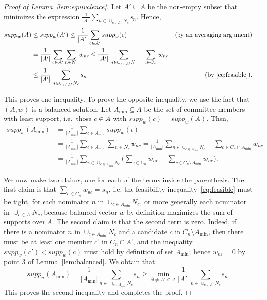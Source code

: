 \begin{proof}[Proof of Lemma~\ref{lem:equivalence}]
Let $A'\subseteq A$ be the non-empty subset that minimizes the expression $\frac{1}{|A'|} \sum_{n\in \cup_{c\in A'} N_c} s_n$. Hence, 
\begin{align*}
    supp_w(A) &\leq supp_w(A') \leq \frac{1}{|A'|} \sum_{c\in A'} supp_w(c) &\text{(by an averaging argument)}\\
    & = \frac{1}{|A'|} \sum_{c\in A'} \sum_{n\in N_c} w_{nc} 
     \leq \frac{1}{|A'|}  \sum_{n\in \cup_{c\in A'} N_c} \quad \sum_{c\in C_n} w_{nc} \\
    & \leq \frac{1}{|A'|} \sum_{n\in \cup_{c\in A'} N_c} s_n &\text{(by \ref{eq:feasible})}.
\end{align*}

This proves one inequality. To prove the opposite inequality, we use the fact that $(A,w)$ is a balanced solution. 
Let $A_{\min}\subseteq A$ be the set of committee members with least support, i.e.~those $c\in A$ with $supp_w(c)=supp_w(A)$. Then,
\begin{align*}
    supp_w(A_{\min}) &= \frac{1}{|A_{\min}|} \sum_{c\in A_{\min}} supp_w(c) \\
    &= \frac{1}{|A_{\min}|} \sum_{c\in A_{\min}} \sum_{n\in N_c} w_{nc} 
    = \frac{1}{|A_{\min}|} \sum_{n\in \cup_{c\in A_{\min}} N_c} \quad \sum_{c\in C_n\cap A_{\min}} w_{nc} \\
    &= \frac{1}{|A_{\min}|} \sum_{n\in \cup_{c\in A_{\min}} N_c} \Big( \sum_{c\in C_n} w_{nc} - \sum_{c\in C_n \setminus A_{\min}} w_{nc}\Big).
\end{align*}

We now make two claims, one for each of the terms inside the parenthesis. 
The first claim is that $\sum_{c\in C_n} w_{nc}=s_n$, i.e. the feasibility inequality~\eqref{eq:feasible} must be tight, for each nominator $n$ in $\cup_{c\in A_{\min}} N_c$, 
or more generally each nominator in $\cup_{c\in A} N_c$, because balanced vector $w$ by definition maximizes the sum of supports over $A$. 
The second claim is that the second term is zero. Indeed, if there is a nominator $n$ in $\cup_{c\in A_{\min}} N_c$ and a candidate $c$ in $C_n\setminus A_{\min}$, then there must be at least one member $c'$ in $C_n\cap A'$, and the inequality $supp_w(c')<supp_w(c)$ must hold by definition of set $A_{\min}$; hence $w_{nc}=0$ by point 3 of Lemma~\ref{lem:balanced}. 
We obtain that 
$$supp_w(A_{\min}) = \frac{1}{|A_{\min}|}\sum_{n\in \cap_{c\in A_{\min}} N_c} s_n \geq \min_{\emptyset\neq A'\subseteq A} \frac{1}{|A'|}\sum_{n\in \cup_{c\in A'}N_c} s_n.$$
This proves the second inequality and completes the proof.
\end{proof}



